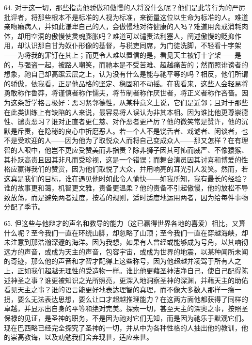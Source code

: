 64. 对于这一切，那些指责他骄傲和傲慢的人将说什么呢？他们是此等行为的严厉批评者，将那些根本不是标准的人视为标准，来衡量这位以生命为标准的人。难道亲吻癞病人，并如此谦卑自己的人，会傲慢地对待健康的人吗？难道用斋戒消耗肉体，却用空洞的傲慢使灵魂膨胀吗？难道可以谴责法利塞人，阐述傲慢的贬抑作用，却认识那自甘为奴仆形像的基督，与税吏同席，为门徒洗脚，不轻看十字架——为将我的罪钉在其上；而更令人难以置信的是，看见天主被钉十字架——是的，与强盗一起，被路人嘲笑，而祂本是不受苦难、超越痛苦的；然而照诽谤者的想象，祂自己却高踞云层之上，认为没有什么是能与祂平等的吗？相反，他们所谓的骄傲，依我看，正是他品格的坚定、稳固和不动摇。在我看来，这些人会轻易将勇敢称作鲁莽，将谨慎者称作懦夫，将节制者称作厌世者，将正义者称作吝啬。因为这条哲学格言极好：恶习紧邻德性，从某种意义上说，它们是近邻；且对于那些在此类训练上有缺陷的人来说，最容易将人误认为非其本相。因为谁比他更尊崇德性、谴责恶习？谁对正直者更仁慈、对作恶者更严厉？他的微笑常是赞许，他的沉默是斥责，在隐秘的良心中折磨恶人。若一个人不是饶舌者、戏谑者、闲谈者，也不是受欢迎的人——因为他为了取悦众人而将自己变成众人\newline{}——那又怎样？在有理智的人眼中，他岂不更应受赞美而非指责？除非狮子因其可怖而威严、不像猿猴、其扑跃高贵且因其非凡而受珍视，这是一个错误；而舞台演员因其讨喜和博爱的性格应赢得我们的赞赏，因为他们取悦了大众，并用响亮的耳光引人发笑。然而，若这真是我们的目标，谁在遇见他时如此令人愉快——如我所知，我有最长的经验？谁的故事更和蔼，机智更文雅，责备更温柔？他的责备不引起傲慢，他的放松不导致放荡，而是避免两者过度，按着的规则，适时适度地运用两者，因为给每件事物分配了季节。\newline{}\par

65. 但这些与他辩才的声名和教导的能力（这已赢得世界各地的喜爱）相比，又算什么呢？至今我们一直在环绕山脚，却忽略了山顶；至今我们一直在穿越海峡，却未注意到那浩瀚深邃的海洋。因为我想，如果有人曾经或能够成为号角，以其响彻远方的声音，或成为天主的声音，包容宇宙，或成为世界的地震，以某种闻所未闻的奇迹，那么他的声音和才智才配得上这些称号，因为他超越并凌驾于所有人之上，正如我们超越无理性的受造物一样。谁比他更藉圣神洁净自己，使自己配得陈述神圣之事？谁更被知识之光所照亮，更深入地洞察圣神的深渊，并藉天主的助佑看见天主之事？谁的语言能更好地表达理智的真理，而不像大多数人那样一瘸一拐，要么无法表达思想，要么让口才超越推理能力？在这两方面他都获得了同样的卓越，并显示出自身的平等和绝对完美。探索一切，甚至天主的深奥之事，按照圣保禄的见证，是圣神的职务，不是因为祂对它们无知，而是因为祂乐于默观它们。现在巴西略已经完全探究了圣神的一切，并从中为各种性格的人抽出他的教训，他的崇高教诲，以及劝勉我们舍弃现世，适应来世。\par

